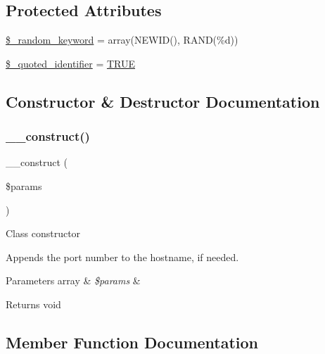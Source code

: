 \subsection*{Protected Attributes}
\begin{DoxyCompactItemize}
\item 
\mbox{\hyperlink{class_c_i___d_b__mssql__driver_a10213aa6e05f6d924d3277bb1d2fea00}{\$\+\_\+random\+\_\+keyword}} = array(\textquotesingle{}N\+E\+W\+ID()\textquotesingle{}, \textquotesingle{}R\+A\+ND(\%d)\textquotesingle{})
\item 
\mbox{\hyperlink{class_c_i___d_b__mssql__driver_a1dae2f0e9ad7299438a9976d6cdbf2ad}{\$\+\_\+quoted\+\_\+identifier}} = \mbox{\hyperlink{constants_8php_ae04a3efe6aa42044f803ee90c2277846}{T\+R\+UE}}
\end{DoxyCompactItemize}


\subsection{Constructor \& Destructor Documentation}
\mbox{\label{class_c_i___d_b__mssql__driver_a9162320adff1a1a4afd7f2372f753a3e}} 
\subsubsection{\texorpdfstring{\+\_\+\+\_\+construct()}{\_\_construct()}}
{\footnotesize\ttfamily \+\_\+\+\_\+construct (\begin{DoxyParamCaption}\item[{}]{\$params }\end{DoxyParamCaption})}

Class constructor

Appends the port number to the hostname, if needed.


\begin{DoxyParams}[1]{Parameters}
array & {\em \$params} & \\
\hline
\end{DoxyParams}
\begin{DoxyReturn}{Returns}
void 
\end{DoxyReturn}


\subsection{Member Function Documentation}
\mbox{\label{class_c_i___d_b__mssql__driver_a4d9082658000e5ede8312067c6dda9db}} 
